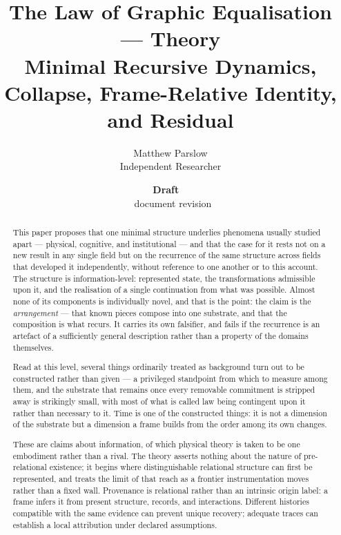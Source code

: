 \documentclass[11pt,a4paper]{article}
\title{The Law of Graphic Equalisation --- Theory\\\large Minimal Recursive Dynamics, Collapse, Frame-Relative Identity, and Residual}
\author{Matthew Parslow\\Independent Researcher}
\date{\textbf{Draft \texorpdfstring{\textemdash}{---}\ \PaperDraft}\\[2pt]\PaperDisplayDate \texorpdfstring{\textbullet}{\textperiodcentered}\ document revision \PaperRevision}
\theoremstyle{remark}\newtheorem{remark}[definition]{Remark}
\begin{document}
\maketitle
\begin{center}
\end{center}
\vspace{1em}

\begin{abstract}
This paper proposes that one minimal structure underlies phenomena usually studied apart --- physical, cognitive, and institutional --- and that the case for it rests not on a new result in any single field but on the recurrence of the same structure across fields that developed it independently, without reference to one another or to this account. The structure is information-level: represented state, the transformations admissible upon it, and the realisation of a single continuation from what was possible. Almost none of its components is individually novel, and that is the point: the claim is the \emph{arrangement} --- that known pieces compose into one substrate, and that the composition is what recurs. It carries its own falsifier, and fails if the recurrence is an artefact of a sufficiently general description rather than a property of the domains themselves.

Read at this level, several things ordinarily treated as background turn out to be constructed rather than given --- a privileged standpoint from which to measure among them, and the substrate that remains once every removable commitment is stripped away is strikingly small, with most of what is called law being contingent upon it rather than necessary to it. Time is one of the constructed things: it is not a dimension of the substrate but a dimension a frame builds from the order among its own changes.

These are claims about information, of which physical theory is taken to be one embodiment rather than a rival. The theory asserts nothing about the nature of pre-relational existence; it begins where distinguishable relational structure can first be represented, and treats the limit of that reach as a frontier instrumentation moves rather than a fixed wall.
Provenance is relational rather than an intrinsic origin label: a frame
infers it from present structure, records, and interactions. Different
histories compatible with the same evidence can prevent unique recovery;
adequate traces can establish a local attribution under declared assumptions.
\end{abstract}
\end{document}
